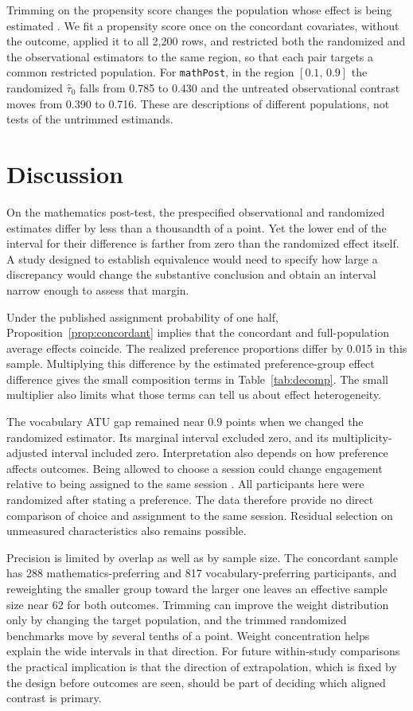\documentclass[twoside,11pt]{article}
\begin{document}
Trimming on the propensity score changes the population whose effect is being estimated \citep{crump2009}. We fit a propensity score once on the concordant covariates, without the outcome, applied it to all 2{,}200 rows, and restricted both the randomized and the observational estimators to the same region, so that each pair targets a common restricted population. For \texttt{mathPost}, in the region $[0.1,\,0.9]$ the randomized $\widehat\tau_0$ falls from 0.785 to 0.430 and the untreated observational contrast moves from 0.390 to 0.716. These are descriptions of different populations, not tests of the untrimmed estimands.

\section{Discussion}
\label{sec:discussion}

On the mathematics post-test, the prespecified observational and randomized estimates differ by less than a thousandth of a point. Yet the lower end of the interval for their difference is farther from zero than the randomized effect itself. A study designed to establish equivalence would need to specify how large a discrepancy would change the substantive conclusion and obtain an interval narrow enough to assess that margin.

Under the published assignment probability of one half, Proposition~\ref{prop:concordant} implies that the concordant and full-population average effects coincide. The realized preference proportions differ by 0.015 in this sample. Multiplying this difference by the estimated preference-group effect difference gives the small composition terms in Table~\ref{tab:decomp}. The small multiplier also limits what those terms can tell us about effect heterogeneity.

The vocabulary ATU gap remained near 0.9 points when we changed the randomized estimator. Its marginal interval excluded zero, and its multiplicity-adjusted interval included zero. Interpretation also depends on how preference affects outcomes. Being allowed to choose a session could change engagement relative to being assigned to the same session \citep{rucker1989,marcus2012}. All participants here were randomized after stating a preference. The data therefore provide no direct comparison of choice and assignment to the same session. Residual selection on unmeasured characteristics also remains possible.

Precision is limited by overlap as well as by sample size. The concordant sample has 288 mathematics-preferring and 817 vocabulary-preferring participants, and reweighting the smaller group toward the larger one leaves an effective sample size near 62 for both outcomes. Trimming can improve the weight distribution only by changing the target population, and the trimmed randomized benchmarks move by several tenths of a point. Weight concentration helps explain the wide intervals in that direction. For future within-study comparisons the practical implication is that the direction of extrapolation, which is fixed by the design before outcomes are seen, should be part of deciding which aligned contrast is primary.
\end{document}
